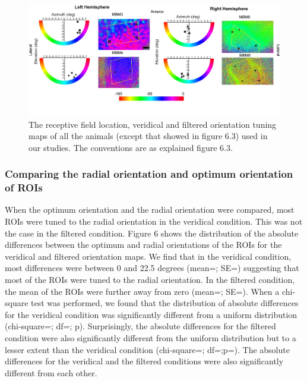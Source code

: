 			
			\begin{figure}
				
				\includegraphics[width=\linewidth]{rb/figure2.jpg}
				\caption{The receptive field location, veridical and filtered orientation tuning maps of  all the animals (except that showed in figure 6.3) used in our studies. The conventions are as explained figure 6.3.}
				\label{fig:fig5}
			\end{figure}
							
		\subsubsection{Comparing the radial orientation and optimum orientation of ROIs}
			When the optimum orientation and the radial orientation were compared, most ROIs were tuned to the radial orientation in the veridical condition. This was not the case in the filtered condition. Figure 6 shows the distribution of the absolute differences between the optimum and radial orientations of the ROIs for the veridical and filtered orientation maps. We find that in the veridical condition, most differences were between 0 and 22.5 degrees (mean=; SE=) suggesting that most of the ROIs were tuned to the radial orientation. In the filtered condition, the mean of the ROIs were further away from zero (mean=; SE=). When a chi-square test was performed, we found that the distribution of absolute differences  for the veridical condition was significantly different from a uniform distribution (chi-square=; df=; p). Surprisingly, the absolute differences for the filtered condition were also significantly different from the uniform distribution but to a lesser extent than the veridical condition (chi-square=; df=;p=). The absolute differences for the veridical and the filtered conditions were also significantly different from each other.
			
